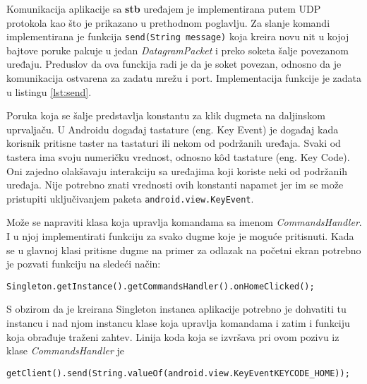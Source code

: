 \documentclass[struktura.tex]{subfiles}
\begin{document}
Komunikacija aplikacije sa \textbf{stb} uređajem je implementirana putem UDP protokola kao što je prikazano u prethodnom poglavlju. Za slanje komandi implementirana je funkcija \verb|send(String message)| koja kreira novu nit u kojoj bajtove poruke pakuje u jedan \textit{DatagramPacket}\cite{sajt:datagram} i preko soketa šalje povezanom uređaju. Preduslov da ova funckija radi je da je soket povezan, odnosno da je komunikacija ostvarena za zadatu mrežu i port. Implementacija funkcije je zadata u listingu \ref{lst:send}.



Poruka koja se šalje predstavlja konstantu za klik dugmeta na daljinskom uprvaljaču. U Androidu događaj tastature (eng. Key Event) je događaj kada korisnik pritisne taster na tastaturi ili nekom od podržanih uređaja. Svaki od tastera ima svoju numeričku vrednost, odnosno k\^{o}d tastature (eng. Key Code). Oni zajedno olakšavaju interakciju sa uređajima koji koriste neki od podržanih uređaja. Nije potrebno znati vrednosti ovih konstanti napamet jer im se može pristupiti uključivanjem paketa \verb|android.view.KeyEvent|. 

Može se napraviti klasa koja upravlja komandama sa imenom \textit{CommandsHandler}. I u njoj implementirati funkciju za svako dugme koje je moguće pritisnuti. Kada se u glavnoj klasi pritisne dugme na primer za odlazak na početni ekran potrebno je pozvati funkciju na sledeći način: 

\verb|Singleton.getInstance().getCommandsHandler().onHomeClicked();|

S obzirom da je kreirana Singleton instanca aplikacije potrebno je dohvatiti tu instancu i nad njom instancu klase koja upravlja komandama i zatim i funkciju koja obrađuje traženi zahtev. Linija koda koja se izvršava pri ovom pozivu iz klase \textit{CommandsHandler} je 

\verb|getClient().send(String.valueOf(android.view.KeyEventKEYCODE_HOME));|
\end{document}
